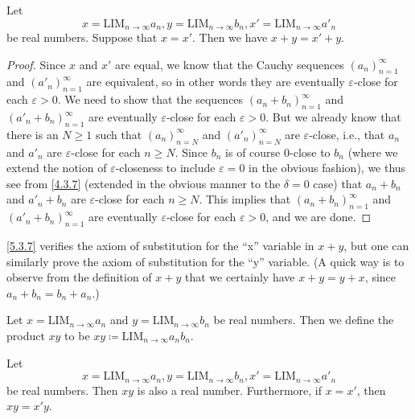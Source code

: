 \begin{lemma}\label{5.3.7}
  Let
  \[
    x = \text{LIM}_{n \to \infty} a_n, y = \text{LIM}_{n \to \infty} b_n, x' = \text{LIM}_{n \to \infty} a'_n
  \]
  be real numbers.
  Suppose that \(x = x'\).
  Then we have \(x + y = x' + y\).
\end{lemma}

\begin{proof}
  Since \(x\) and \(x'\) are equal, we know that the Cauchy sequences \((a_n)_{n = 1}^{\infty}\) and \((a'_n)_{n = 1}^{\infty}\) are equivalent, so in other words they are eventually \(\varepsilon\)-close for each \(\varepsilon > 0\).
  We need to show that the sequences \((a_n + b_n)_{n = 1}^{\infty}\) and \((a'_n + b_n)_{n = 1}^{\infty}\) are eventually \(\varepsilon\)-close for each \(\varepsilon > 0\).
  But we already know that there is an \(N \geq 1\) such that \((a_n)_{n = N}^{\infty}\) and \((a'_n)_{n = N}^{\infty}\) are \(\varepsilon\)-close, i.e., that \(a_n\) and \(a'_n\) are \(\varepsilon\)-close for each \(n \geq N\).
  Since \(b_n\) is of course \(0\)-close to \(b_n\) (where we extend the notion of \(\varepsilon\)-closeness to include \(\varepsilon = 0\) in the obvious fashion), we thus see from \cref{4.3.7} (extended in the obvious manner to the \(\delta = 0\) case) that \(a_n + b_n\) and \(a'_n + b_n\) are \(\varepsilon\)-close for each \(n \geq N\).
  This implies that \((a_n + b_n)_{n = 1}^{\infty}\) and \((a'_n + b_n)_{n = 1}^{\infty}\) are eventually \(\varepsilon\)-close for each \(\varepsilon > 0\), and we are done.
\end{proof}

\begin{remark}\label{5.3.8}
  \cref{5.3.7} verifies the axiom of substitution for the ``x'' variable in \(x + y\), but one can similarly prove the axiom of substitution for the ``y'' variable.
  (A quick way is to observe from the definition of \(x + y\) that we certainly have \(x + y = y + x\), since \(a_n + b_n = b_n + a_n\).)
\end{remark}

\begin{definition}\label{5.3.9}
  Let \(x = \text{LIM}_{n \to \infty} a_n\) and \(y = \text{LIM}_{n \to \infty} b_n\) be real numbers.
  Then we define the product \(xy\) to be \(xy \coloneqq \text{LIM}_{n \to \infty} a_n b_n\).
\end{definition}

\begin{proposition}\label{5.3.10}
  Let
  \[
    x = \text{LIM}_{n \to \infty} a_n, y = \text{LIM}_{n \to \infty} b_n, x' = \text{LIM}_{n \to \infty} a'_n
  \]
  be real numbers.
  Then \(xy\) is also a real number.
  Furthermore, if \(x = x'\), then \(xy = x'y\).
\end{proposition}


